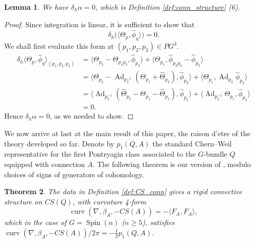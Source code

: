 \documentclass[12pt]{amsart}
\DeclareMathOperator{\Ad}{Ad}
\DeclareMathOperator{\Spin}{Spin}
\theoremstyle{plain}
\newtheorem{theorem}{Theorem}[section]
\newtheorem{lemma}[theorem]{Lemma}
\theoremstyle{definition}
\theoremstyle{remark}
\numberwithin{equation}{section}
\DeclareMathOperator{\curv}{curv}
\newcommand{\<}{\langle}
\renewcommand{\>}{\rangle}
\newcommand{\Thetahat}{\widehat{\Theta}}
\newcommand{\phihat}{\widehat{\phi}}
\begin{document}
\begin{lemma}\label{lemma:rigid_conn_str_3}
We have $\delta_h\alpha = 0$, which is Definition \ref{def:conn_structure} (6).
\end{lemma}
\begin{proof}
Since integration is linear, it is sufficient to show that
\[
  \delta_h\Big( \langle \Theta_p ,\phihat_q\rangle\Big)  = 0.
\]
We shall first evaluate this form at $(p_1,p_2,p_3)\in PG^3$. 
\begin{align*}
   \delta_h \langle \Theta_p,\phihat_q\rangle_{(p_1,p_2,p_3)} 
   &=  
      \langle \Theta_{p_2} - \Theta_{p_1p_2},\phihat_{p_3}\rangle + \langle \Theta_{p_1},\phihat_{p_2p_3}-\phihat_{p_2}\rangle 
    \\
   &=  \langle \Theta_{p_2} - \Ad_{p_2^{-1}}(\Theta_{p_1} + \Thetahat_{p_2} 
      ) ,\phihat_{p_3}\rangle
      + \langle \Theta_{p_1},\Ad_{p_2}\phihat_{p_3}\rangle
    \\
    &=  \langle\Ad_{p_2^{-1}}( {\Thetahat_{p_2}}  
          - { \Theta_{p_1}} - {\Thetahat_{p_2}} 
          ),\phihat_{p_3}\rangle
           + {\langle\Ad_{p_2^{-1}}\Theta_{p_1},\phihat_{p_3}\rangle}
    \\
    &=  0.
\end{align*}
Hence $\delta_h\alpha = 0$, as we needed to show.
\end{proof}


We now arrive at last at the main result of this paper, the raison d'etre of the theory developed so far. Denote by $p_1(Q,A)$ the standard Chern--Weil representative for the first Pontryagin class associated to the $G$-bundle $Q$ equipped with connection $A$. The following theorem is our version of \cite[Theorem~2.7]{Wal}, modulo choices of signs of generators of cohomology. 





\begin{theorem}\label{thm:CSrb2g_conn_str}
The data in Definition \ref{def:CS_conn} gives a rigid connective structure on $CS(Q)$, with curvature 4-form
\[
  \curv(\nabla,\beta_A,-CS(A)) = -\langle F_A,F_A\rangle,
\]
 which in the case of $G=\Spin(n)$ ($n\geq5$), satisfies $\curv(\nabla,\beta_A,-CS(A))/2\pi = -\frac12 p_1(Q,A)$.
\end{theorem}
\end{document}

